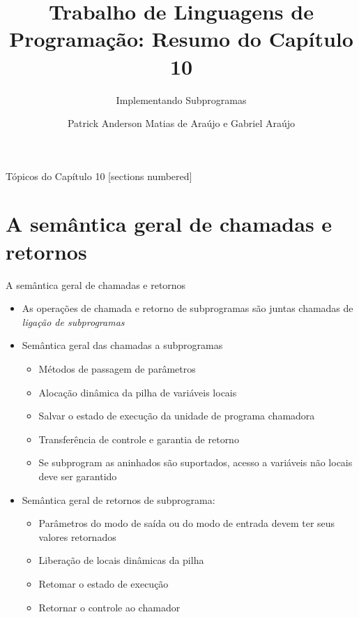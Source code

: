 \documentclass[10pt]{beamer}
\title{Trabalho de Linguagens de Programação: Resumo do Capítulo 10}
\subtitle{Implementando Subprogramas}
\date{}
\author{Patrick Anderson Matias de Araújo e Gabriel Araújo}
\institute{Universidade Federal do Tocantins}
\begin{document}
\maketitle

\begin{frame}{Tópicos do Capítulo 10}
  [sections numbered]
  \tableofcontents[hideallsubsections]
\end{frame}

\section{A semântica geral de chamadas e retornos}

\begin{frame}[fragile]{A semântica geral de chamadas e retornos}

    \begin{itemize}
        \item As operações de chamada e retorno de subprogramas são juntas chamadas de \textit{ligação de subprogramas}
        \item Semântica geral das chamadas a subprogramas
        \begin{itemize}
            \item Métodos de passagem de parâmetros
            \item Alocação dinâmica da pilha de variáveis locais
            \item Salvar o estado de execução da unidade de programa chamadora
            \item Transferência de controle e garantia de retorno
            \item Se subprogram as aninhados são suportados, acesso a variáveis não locais deve ser garantido
        \end{itemize}
        \item Semântica geral de retornos de subprograma:
        \begin{itemize}
            \item Parâmetros do modo de saída ou do modo de entrada devem ter seus valores retornados
            \item Liberação de locais  dinâmicas da pilha
            \item Retomar o estado de execução
            \item Retornar o controle ao chamador
        \end{itemize}
    \end{itemize}

\end{frame}
\end{document}
